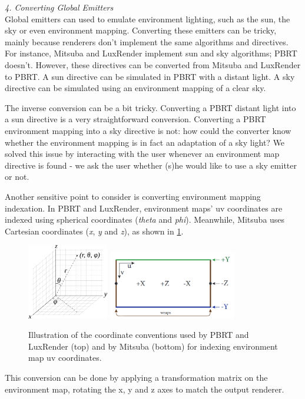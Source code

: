\textit{4. Converting Global Emitters} \\
Global emitters can used to emulate environment lighting, such as the sun, the
sky or even environment mapping. Converting these emitters can be tricky, mainly
because renderers don't implement the same algorithms and directives. For
instance, Mitsuba and LuxRender implement sun and sky algorithms; PBRT doesn't.
However, these directives can be converted from Mitsuba and LuxRender to PBRT. A
sun directive can be simulated in PBRT with a distant light. A sky directive can
be simulated using an environment mapping of a clear sky.

The inverse conversion can be a bit tricky. Converting a PBRT distant light into
a sun directive is a very straightforward conversion. Converting a PBRT
environment mapping into a sky directive is not: how could the converter know
whether the environment mapping is in fact an adaptation of a sky light? We
solved this issue by interacting with the user whenever an environment map
directive is found - we ask the user whether (s)he would like to use a sky
emitter or not.

Another sensitive point to consider is converting environment mapping 
indexation. In PBRT and LuxRender, environment maps' uv coordinates are indexed 
using spherical coordinates (\textit{theta} and \textit{phi}). Meanwhile, 
Mitsuba uses Cartesian coordinates (\textit{x}, \textit{y} and \textit{z}), as 
shown in \ref{fig:mitdocemitter}. 

\begin{figure}[h]
\centering
\includegraphics[width=1.4in]{figs/3_system_architecture/spherical_coordinates.png}
\includegraphics[width=2.2in]{figs/3_system_architecture/mitdocemitter.png}
\caption{Illustration of the coordinate conventions used by PBRT and LuxRender 
(top) and by Mitsuba (bottom) for indexing environment map uv coordinates.}
\label{fig:mitdocemitter}
\end{figure}

This conversion can be done by applying a transformation matrix on the 
environment map, rotating the x, y and z axes to match the output renderer. 